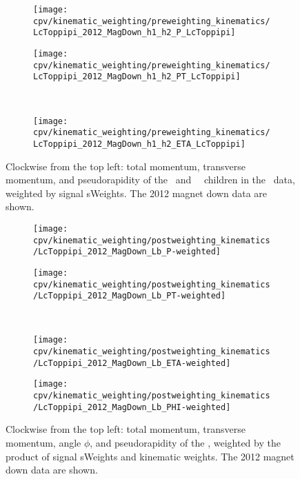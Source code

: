 \begin{figure}
  \begin{subfigure}[b]{0.5\textwidth}
    \centering
    \texttt{[image: cpv/kinematic\_weighting/preweighting\_kinematics/LcToppipi\_2012\_MagDown\_h1\_h2\_P\_LcToppipi]}
    \label{fig:cpv:kinematic_weighting:pre:ppipi_h1h2:P}
  \end{subfigure}
  \begin{subfigure}[b]{0.5\textwidth}
    \centering
    \texttt{[image: cpv/kinematic\_weighting/preweighting\_kinematics/LcToppipi\_2012\_MagDown\_h1\_h2\_PT\_LcToppipi]}
    \label{fig:cpv:kinematic_weighting:pre:ppipi_h1h2:PT}
  \end{subfigure}\\
  \begin{subfigure}[b]{\textwidth}
    \centering
    \texttt{[image: cpv/kinematic\_weighting/preweighting\_kinematics/LcToppipi\_2012\_MagDown\_h1\_h2\_ETA\_LcToppipi]}
    \label{fig:cpv:kinematic_weighting:pre:ppipi_h1h2:ETA}
  \end{subfigure}
  \caption{%
    Clockwise from the top left: total momentum, transverse momentum, and 
    pseudorapidity of the \Ppiminus\ and \Ppiplus\ \PLambdac\ children in the 
    \ppipi\ data, weighted by signal sWeights.
    The 2012 magnet down data are shown.
  }
  \label{fig:cpv:kinematic_weighting:pre:ppipi_h1h2}
\end{figure}

\begin{figure}
  \begin{subfigure}[b]{0.4\textwidth}
    \texttt{[image: cpv/kinematic\_weighting/postweighting\_kinematics/LcToppipi\_2012\_MagDown\_Lb\_P-weighted]}
    \label{fig:cpv:kinematic_weighting:post:Lb:P}
  \end{subfigure}
  \begin{subfigure}[b]{0.4\textwidth}
    \texttt{[image: cpv/kinematic\_weighting/postweighting\_kinematics/LcToppipi\_2012\_MagDown\_Lb\_PT-weighted]}
    \label{fig:cpv:kinematic_weighting:post:Lb:PT}
  \end{subfigure}\\
  \begin{subfigure}[b]{0.4\textwidth}
    \texttt{[image: cpv/kinematic\_weighting/postweighting\_kinematics/LcToppipi\_2012\_MagDown\_Lb\_ETA-weighted]}
    \label{fig:cpv:kinematic_weighting:post:Lb:ETA}
  \end{subfigure}
  \begin{subfigure}[b]{0.4\textwidth}
    \texttt{[image: cpv/kinematic\_weighting/postweighting\_kinematics/LcToppipi\_2012\_MagDown\_Lb\_PHI-weighted]}
    \label{fig:cpv:kinematic_weighting:post:Lb:PHI}
  \end{subfigure}
  \caption{%
    Clockwise from the top left: total momentum, transverse momentum, angle 
    $\phi$, and pseudorapidity of the \PLambdab, weighted by the product of 
    signal sWeights and kinematic weights.
    The 2012 magnet down data are shown.
  }
  \label{fig:cpv:kinematic_weighting:post:Lb}
\end{figure}

